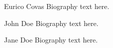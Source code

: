 \documentclass[journal]{IEEEtran}
\begin{document}


% 

\begin{IEEEbiographynophoto}{Eurico Covas}
Biography text here.
\end{IEEEbiographynophoto}

\begin{IEEEbiographynophoto}{John Doe}
Biography text here.
\end{IEEEbiographynophoto}


\begin{IEEEbiographynophoto}{Jane Doe}
Biography text here.
\end{IEEEbiographynophoto}






\end{document}
